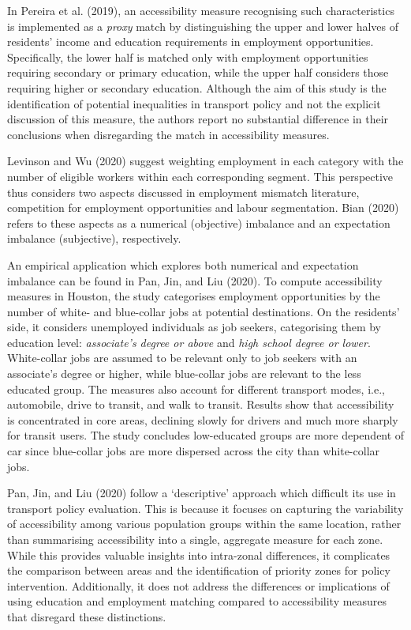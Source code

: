 \documentclass{article}
\begin{document}
In Pereira et al. (2019), an accessibility measure recognising such
characteristics is implemented as a \emph{proxy} match by distinguishing
the upper and lower halves of residents' income and education
requirements in employment opportunities. Specifically, the lower half
is matched only with employment opportunities requiring secondary or
primary education, while the upper half considers those requiring higher
or secondary education. Although the aim of this study is the
identification of potential inequalities in transport policy and not the
explicit discussion of this measure, the authors report no substantial
difference in their conclusions when disregarding the match in
accessibility measures.

Levinson and Wu (2020) suggest weighting employment in each category
with the number of eligible workers within each corresponding segment.
This perspective thus considers two aspects discussed in employment
mismatch literature, competition for employment opportunities and labour
segmentation. Bian (2020) refers to these aspects as a numerical
(objective) imbalance and an expectation imbalance (subjective),
respectively.

An empirical application which explores both numerical and expectation
imbalance can be found in Pan, Jin, and Liu (2020). To compute
accessibility measures in Houston, the study categorises employment
opportunities by the number of white- and blue-collar jobs at potential
destinations. On the residents' side, it considers unemployed
individuals as job seekers, categorising them by education level:
\emph{associate's degree or above} and \emph{high school degree or
lower}. White-collar jobs are assumed to be relevant only to job seekers
with an associate's degree or higher, while blue-collar jobs are
relevant to the less educated group. The measures also account for
different transport modes, i.e., automobile, drive to transit, and walk
to transit. Results show that accessibility is concentrated in core
areas, declining slowly for drivers and much more sharply for transit
users. The study concludes low-educated groups are more dependent of car
since blue-collar jobs are more dispersed across the city than
white-collar jobs.

Pan, Jin, and Liu (2020) follow a `descriptive' approach which difficult
its use in transport policy evaluation. This is because it focuses on
capturing the variability of accessibility among various population
groups within the same location, rather than summarising accessibility
into a single, aggregate measure for each zone. While this provides
valuable insights into intra-zonal differences, it complicates the
comparison between areas and the identification of priority zones for
policy intervention. Additionally, it does not address the differences
or implications of using education and employment matching compared to
accessibility measures that disregard these distinctions.
\end{document}
